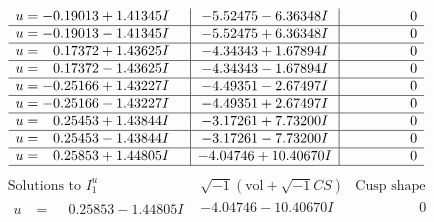 \documentclass[1p]{elsarticle_modified}
\theoremstyle{definition}
\newcommand{\I}{\sqrt{-1}}
\begin{document}
$$\begin{array}{c|c|c}
\begin{aligned}
u &= -0.19013 + 1.41345 I\end{aligned}
 & -5.52475 - 6.36348 I & \phantom{-0.000000 } 0 \\ \hline\begin{aligned}
u &= -0.19013 - 1.41345 I\end{aligned}
 & -5.52475 + 6.36348 I & \phantom{-0.000000 } 0 \\ \hline\begin{aligned}
u &= \phantom{-}0.17372 + 1.43625 I\end{aligned}
 & -4.34343 + 1.67894 I & \phantom{-0.000000 } 0 \\ \hline\begin{aligned}
u &= \phantom{-}0.17372 - 1.43625 I\end{aligned}
 & -4.34343 - 1.67894 I & \phantom{-0.000000 } 0 \\ \hline\begin{aligned}
u &= -0.25166 + 1.43227 I\end{aligned}
 & -4.49351 - 2.67497 I & \phantom{-0.000000 } 0 \\ \hline\begin{aligned}
u &= -0.25166 - 1.43227 I\end{aligned}
 & -4.49351 + 2.67497 I & \phantom{-0.000000 } 0 \\ \hline\begin{aligned}
u &= \phantom{-}0.25453 + 1.43844 I\end{aligned}
 & -3.17261 + 7.73200 I & \phantom{-0.000000 } 0 \\ \hline\begin{aligned}
u &= \phantom{-}0.25453 - 1.43844 I\end{aligned}
 & -3.17261 - 7.73200 I & \phantom{-0.000000 } 0 \\ \hline\begin{aligned}
u &= \phantom{-}0.25853 + 1.44805 I\end{aligned}
 & -4.04746 + 10.40670 I & \phantom{-0.000000 } 0\\
 \hline 
 \end{array}$$\newpage$$\begin{array}{c|c|c}  
\text{Solutions to }I^u_{1}& \I (\text{vol} + \sqrt{-1}CS) & \text{Cusp shape}\\
 \hline 
\begin{aligned}
u &= \phantom{-}0.25853 - 1.44805 I\end{aligned}
 & -4.04746 - 10.40670 I & \phantom{-0.000000 } 0 \\ \hline\begin{aligned}

\end{aligned}
\end{array}$$
\end{document}
